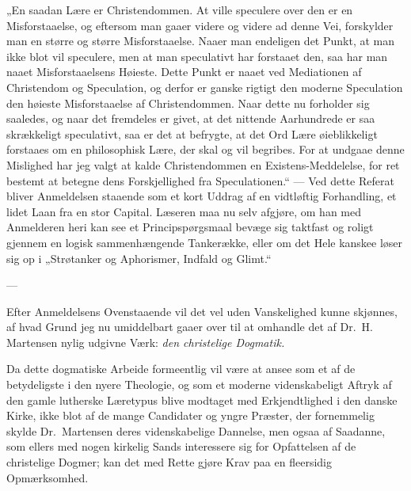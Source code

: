 „En saadan Lære er Christendommen. At ville speculere over den er
en Misforstaaelse, og eftersom man gaaer videre og videre ad denne
Vei, forskylder man en større og større Misforstaaelse. Naaer man
endeligen det Punkt, at man ikke blot vil speculere, men at man
speculativt har forstaaet den, saa har man naaet Misforstaaelsens
Høieste. Dette Punkt er naaet ved Mediationen af Christendom og
Speculation, og derfor er ganske rigtigt den moderne Speculation
den høieste Misforstaaelse af Christendommen. Naar dette nu
forholder sig saaledes, og naar det fremdeles er givet, at det
nittende Aarhundrede er saa skrækkeligt speculativt, saa er det at
befrygte, at det Ord Lære øieblikkeligt forstaaes om en
philosophisk Lære, der skal og vil begribes. For at undgaae denne
Mislighed har jeg valgt at kalde Christendommen en
Existens-Meddelelse, for ret bestemt at betegne dens
Forskjellighed fra Speculationen.“
 --- Ved dette Referat bliver Anmeldelsen staaende som et kort
Uddrag af en vidtløftig Forhandling, et lidet Laan fra en stor
Capital. Læseren maa nu selv afgjøre, om han med Anmelderen heri
kan see et Principspørgsmaal bevæge sig taktfast og roligt gjennem
en logisk sammenhængende Tankerække, eller om det Hele kanskee
løser sig op i „Strøtanker og Aphorismer, Indfald og Glimt.“

\begin{center}---\end{center}

Efter Anmeldelsens Ovenstaaende vil det vel uden Vanskelighed
kunne skjønnes, af hvad Grund jeg nu umiddelbart gaaer over til at
omhandle det af Dr.\ H. Martensen nylig udgivne Værk: \emph{den
christelige Dogmatik.}

Da dette dogmatiske Arbeide formeentlig vil være at ansee som et
af de betydeligste i den nyere Theologie, og som et moderne
videnskabeligt Aftryk af den gamle lutherske Læretypus blive
modtaget med Erkjendtlighed i den danske Kirke, ikke blot af de
mange Candidater og yngre Præster, der fornemmelig skylde Dr.\
Martensen deres videnskabelige Dannelse, men ogsaa af Saadanne,
som ellers med nogen kirkelig Sands interessere sig for
Opfattelsen af de christelige Dogmer; kan det med Rette gjøre Krav
paa en fleersidig Opmærksomhed.

